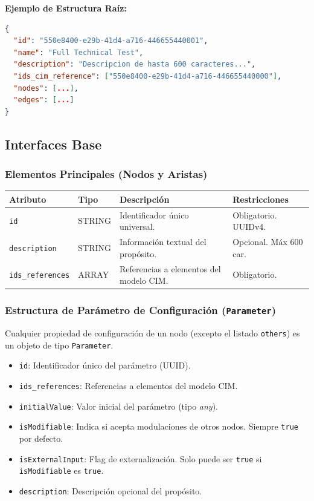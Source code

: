 \textbf{Ejemplo de Estructura Raíz:}
\begin{lstlisting}[language=json]
{
  "id": "550e8400-e29b-41d4-a716-446655440001",
  "name": "Full Technical Test",
  "description": "Descripcion de hasta 600 caracteres...",
  "ids_cim_reference": ["550e8400-e29b-41d4-a716-446655440000"],
  "nodes": [...],
  "edges": [...]
}
\end{lstlisting}

\subsection{Interfaces Base}

\subsubsection{Elementos Principales (Nodos y Aristas)}

\begin{table}[H]
\centering
\small
\begin{tabular}{@{}llp{4cm}l@{}}
\toprule
Atributo & Tipo & Descripción & Restricciones \\ \midrule
\texttt{id} & STRING & Identificador único universal. & Obligatorio. UUIDv4. \\
\texttt{description} & STRING & Información textual del propósito. & Opcional. Máx 600 car. \\
\texttt{ids\_references} & ARRAY & Referencias a elementos del modelo CIM. & Obligatorio. \\ \bottomrule
\end{tabular}
\end{table}

\subsubsection{Estructura de Parámetro de Configuración (\texttt{Parameter})}

Cualquier propiedad de configuración de un nodo (excepto el listado \texttt{others}) es un objeto de tipo \texttt{Parameter}.

\begin{itemize}
    \item \texttt{id}: Identificador único del parámetro (UUID).
    \item \texttt{ids\_references}: Referencias a elementos del modelo CIM.
    \item \texttt{initialValue}: Valor inicial del parámetro (tipo \textit{any}).
    \item \texttt{isModifiable}: Indica si acepta modulaciones de otros nodos. Siempre \texttt{true} por defecto.
    \item \texttt{isExternalInput}: Flag de externalización. Solo puede ser \texttt{true} si \texttt{isModifiable} es \texttt{true}.
    \item \texttt{description}: Descripción opcional del propósito.
\end{itemize}

